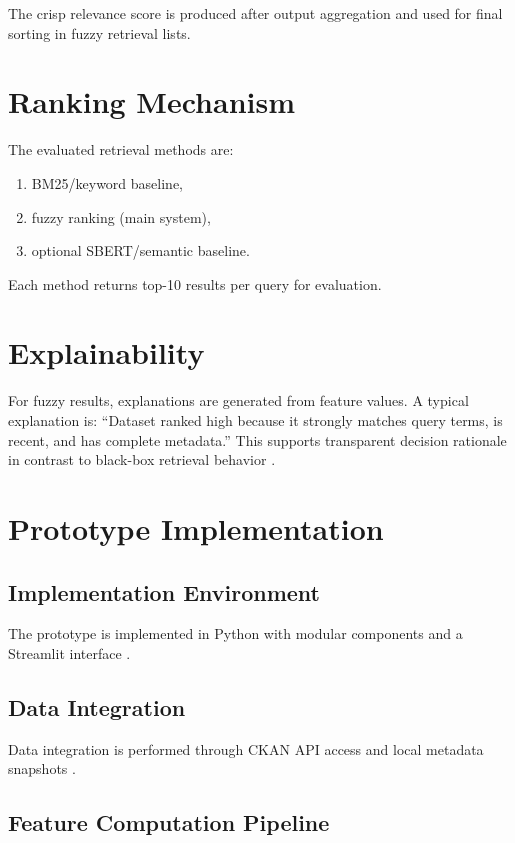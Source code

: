 \documentclass[11pt,a4paper]{article}
\begin{document}
The crisp relevance score is produced after output aggregation and used for final sorting in fuzzy retrieval lists.

\section{Ranking Mechanism}

The evaluated retrieval methods are:
\begin{enumerate}
  \item BM25/keyword baseline,
  \item fuzzy ranking (main system),
  \item optional SBERT/semantic baseline.
\end{enumerate}

Each method returns top-10 results per query for evaluation.

\section{Explainability}

For fuzzy results, explanations are generated from feature values. A typical explanation is: ``Dataset ranked high because it strongly matches query terms, is recent, and has complete metadata.'' This supports transparent decision rationale in contrast to black-box retrieval behavior \citep{doshi2017}.

\section{Prototype Implementation}

\subsection{Implementation Environment}

The prototype is implemented in Python with modular components and a Streamlit interface \citep{streamlit2026}.

\subsection{Data Integration}

Data integration is performed through CKAN API access and local metadata snapshots \citep{ckan2026,opendataswiss2026,ogdSnapshot2026}.

\subsection{Feature Computation Pipeline}
\end{document}
